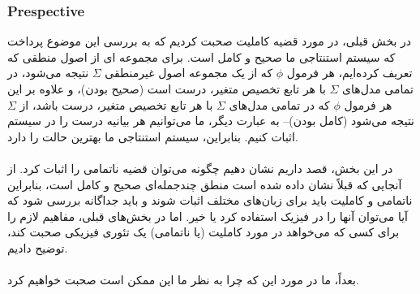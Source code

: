 \documentclass[10pt,a4paper]{article}
\begin{document}
                    \subsubsection{Prespective}
در بخش قبلی، در مورد قضیه کاملیت صحبت کردیم که به بررسی این موضوع پرداخت که سیستم استنتاجی ما صحیح و کامل است. برای مجموعه ای از اصول منطقی که تعریف کرده‌ایم، هر فرمول $\phi$ که از یک مجموعه اصول غیرمنطقی $\Sigma$ نتیجه می‌شود، در تمامی مدل‌های $\Sigma$ با هر تابع تخصیص متغیر، درست است (صحیح بودن)، و علاوه بر این هر فرمول $\phi$ که در تمامی مدل‌های $\Sigma$ با هر تابع تخصیص متغیر، درست باشد، از $\Sigma$ نتیجه می‌شود (کامل بودن)-- به عبارت دیگر، ما می‌توانیم هر بیانیه درست را در سیستم اثبات کنیم. بنابراین، سیستم استنتاجی ما بهترین حالت را دارد.\cite{Hajek2007-fq}
                        \\
                        \\
در این بخش، قصد داریم نشان دهیم چگونه می‌توان قضیه ناتمامی را اثبات کرد. از آنجایی که قبلاً نشان داده شده است منطق چندجمله‌ای صحیح و کامل است، بنابراین ناتمامی و کاملیت باید برای زبان‌های مختلف اثبات شوند و باید جداگانه بررسی شود که آیا می‌توان آنها را در فیزیک استفاده کرد یا خیر. اما در بخش‌های قبلی، مفاهیم لازم را برای کسی که می‌خواهد در مورد کاملیت (یا ناتمامی) یک تئوری فیزیکی صحبت کند، توضیح دادیم.
                        \\
                        \\
بعداً، ما در مورد این که چرا به نظر ما این ممکن است صحبت خواهیم کرد.
\end{document}
